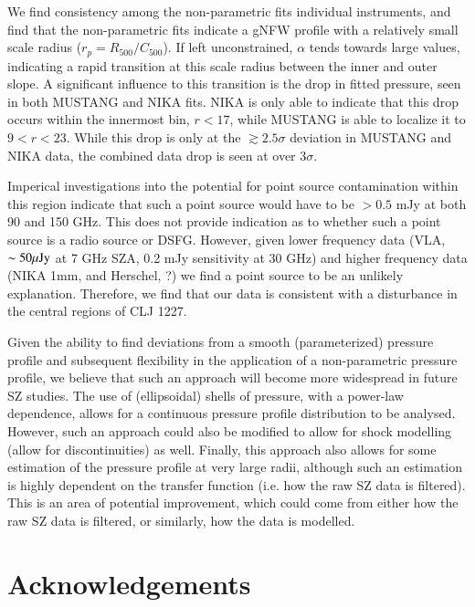 \documentclass[twocolumn,traditabstract]{aa}
\begin{document}
We find consistency among the non-parametric fits individual instruments, and find that the
non-parametric fits indicate a gNFW profile with a relatively small scale radius
($r_p = R_{500}/C_{500}$). If left unconstrained, $\alpha$ tends towards large values, indicating
a rapid transition at this scale radius between the inner and outer slope. A significant
influence to this transition is the drop in fitted pressure, seen in both MUSTANG and NIKA
fits. NIKA is only able to indicate that this drop occurs within the innermost bin, $r < 17$\asec,
while MUSTANG is able to localize it to $9 < r < 23$\asec. While this drop is only at the
$\gtrsim 2.5 \sigma$ deviation in MUSTANG and NIKA data, the combined data drop is seen at over
$3 \sigma$.

Imperical investigations into the potential for point source contamination within this region
indicate that such a point source would have to be $> 0.5$ mJy at both 90 and 150 GHz. This does
not provide indication as to whether such a point source is a radio source or DSFG. However,
given lower frequency data (VLA, $\sim 50 {\rm \mu Jy}$ at 7 GHz
SZA, 0.2 mJy sensitivity at 30 GHz) and higher frequency data
(NIKA 1mm, and Herschel, ?) we find a point source to be an unlikely explanation. Therefore,
we find that our data is consistent with a disturbance in the central regions of CLJ 1227.

Given the ability to find deviations from a smooth (parameterized) pressure profile and
subsequent flexibility in the application of a non-parametric pressure profile, we believe that
such an approach will become more widespread in future SZ studies. The use of (ellipsoidal) shells
of pressure, with a power-law dependence, allows for a continuous pressure profile distribution
to be analysed. However, such an approach could also be modified to allow for shock modelling
(allow for discontinuities) as well. Finally, this approach also allows for some estimation of
the pressure profile at very large radii, although such an estimation is highly dependent on the
transfer function (i.e. how the raw SZ data is filtered). This is an area of potential improvement,
which could come from either how the raw SZ data is filtered, or similarly, how the data is modelled.

\section*{Acknowledgements}
\end{document}
